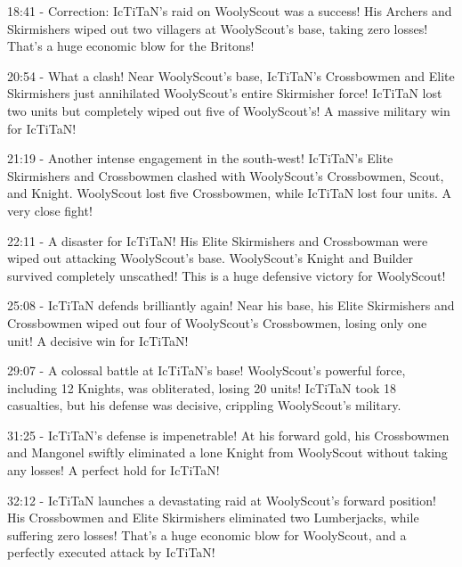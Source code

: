 18:41 - Correction: IcTiTaN's raid on WoolyScout was a success! His Archers and Skirmishers wiped out two villagers at WoolyScout's base, taking zero losses! That's a huge economic blow for the Britons! \par \vspace{1em}

20:54 - What a clash! Near WoolyScout's base, IcTiTaN's Crossbowmen and Elite Skirmishers just annihilated WoolyScout's entire Skirmisher force! IcTiTaN lost two units but completely wiped out five of WoolyScout's! A massive military win for IcTiTaN! \par \vspace{1em}

21:19 - Another intense engagement in the south-west! IcTiTaN's Elite Skirmishers and Crossbowmen clashed with WoolyScout's Crossbowmen, Scout, and Knight. WoolyScout lost five Crossbowmen, while IcTiTaN lost four units. A very close fight! \par \vspace{1em}

22:11 - A disaster for IcTiTaN! His Elite Skirmishers and Crossbowman were wiped out attacking WoolyScout's base. WoolyScout's Knight and Builder survived completely unscathed! This is a huge defensive victory for WoolyScout! \par \vspace{1em}

25:08 - IcTiTaN defends brilliantly again! Near his base, his Elite Skirmishers and Crossbowmen wiped out four of WoolyScout's Crossbowmen, losing only one unit! A decisive win for IcTiTaN! \par \vspace{1em}

29:07 - A colossal battle at IcTiTaN's base! WoolyScout's powerful force, including 12 Knights, was obliterated, losing 20 units! IcTiTaN took 18 casualties, but his defense was decisive, crippling WoolyScout's military. \par \vspace{1em}

31:25 - IcTiTaN's defense is impenetrable! At his forward gold, his Crossbowmen and Mangonel swiftly eliminated a lone Knight from WoolyScout without taking any losses! A perfect hold for IcTiTaN! \par \vspace{1em}

32:12 - IcTiTaN launches a devastating raid at WoolyScout's forward position! His Crossbowmen and Elite Skirmishers eliminated two Lumberjacks, while suffering zero losses! That's a huge economic blow for WoolyScout, and a perfectly executed attack by IcTiTaN! \par \vspace{1em}

